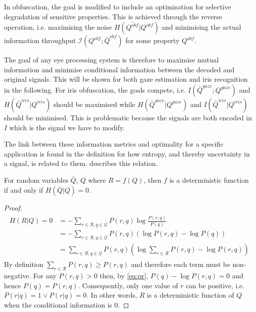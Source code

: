 In obfuscation, the goal is modified to include an optimisation for selective degradation of sensitive properties. This is achieved through the reverse operation, i.e. maximising the noise $H(\bar{Q^{obf}}|Q^{obf})$ and minimising the actual information throughput $\mathcal{I}(Q^{obf};\bar{Q}^{obf})$ for some property $Q^{obf}$. 

The goal of any eye processing system is therefore to maximise mutual information and minimise conditional information between the decoded and original signals. This will be shown for both gaze estimation and iris recognition in the following. For iris obfuscation, the goals compete, i.e. $I(\bar{Q}^{gaze};Q^{gaze})$ and $H(\bar{Q}^{iris}|Q^{iris})$ should be maximised while $H(\bar{Q}^{gaze}|Q^{gaze})$ and $I(\bar{Q}^{iris}|Q^{iris})$ should be minimised. This is problematic because the signals are both encoded in $I$ which is the signal we have to modify. 

The link between these information metrics and optimality for a specific application is found in the definition for how entropy, and thereby uncertainty in a signal, is related to them.  describes this relation.

\begin{theorem}
    For random variables $\bar{Q}$, $Q$ where $R=f(Q)$, then $f$ is a deterministic function if and only if $H(\bar{Q}|Q)=0$.
\end{theorem}

\begin{proof}

\begin{align}\label{eq:pr}
\begin{aligned}
    H(R|Q) = 0 &=-\sum_{r\in\mathcal{R}, q\in\mathcal{Q}} P(r,q)\log\frac{P(r,q)}{P(q)}\\
    &= -\sum_{r\in\mathcal{R}, q\in\mathcal{Q}} P(r,q)\left(\log P(r,q) - \log P(q)\right)\\
    &= \sum_{r\in\mathcal{R}, q\in\mathcal{Q}} P(r, q)\left(\log \sum_{r\in\mathcal{R}} P(r, q) - \log P(r,q)\right)
\end{aligned}
\end{align}
By definition $\sum_{r\in\mathcal{R}} P(r, q) \geq P(r,q)$ and therefore each term must be non-negative. For any $P(r,q) > 0$ then, by \cref{eq:pr}, $P(q) - \log P(r,q) = 0$ and hence $P(q) = P(r,q)$. Consequently, only one value of $r$ can be positive, i.e. $P(r|q) = 1 \vee P(r|q) = 0$. In other words, $R$ is a deterministic function of $Q$ when the conditional information is $0$. 
\end{proof}

